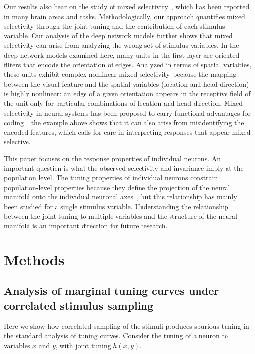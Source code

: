 \documentclass[11pt]{article}
\begin{document}
Our results also bear on the study of mixed selectivity~\cite{Rigotti2013}, which has been reported in many brain areas and tasks. Methodologically, our approach quantifies mixed selectivity through the joint tuning and the contribution of each stimulus variable. Our analysis of the deep network models further shows that mixed selectivity can arise from analyzing the wrong set of stimulus variables. In the deep network models examined here, many units in the first layer are oriented filters that encode the orientation of edges.
Analyzed in terms of spatial variables, these units exhibit complex nonlinear mixed selectivity, because the mapping between the visual feature and the spatial variables (location and head direction) is highly nonlinear: an edge of a given orientation appears in the receptive field of the unit only for particular combinations of location and head direction. Mixed selectivity in neural systems has been proposed to carry functional advantages for coding~\cite{Rigotti2013,Fusi2016neurons}; the example above shows that it can also arise from misidentifying the encoded features, which calls for care in interpreting responses that appear mixed selective.

This paper focuses on the response properties of individual neurons. An important question is what the observed selectivity and invariance imply at the population level. The tuning properties of individual neurons constrain population-level properties because they define the projection of the neural manifold onto the individual neuronal axes~\cite{Kriegeskorte2021}, but this relationship has mainly been studied for a single stimulus variable. Understanding the relationship between the joint tuning to multiple variables and the structure of the neural manifold is an important direction for future research.

\newpage

\section{Methods}

\subsection{Analysis of marginal tuning curves under correlated stimulus sampling}
Here we show how correlated sampling of the stimuli produces spurious tuning in the standard analysis of tuning curves. Consider the tuning of a neuron to variables $x$ and $y$, with joint tuning $h(x,y)$.
\end{document}
